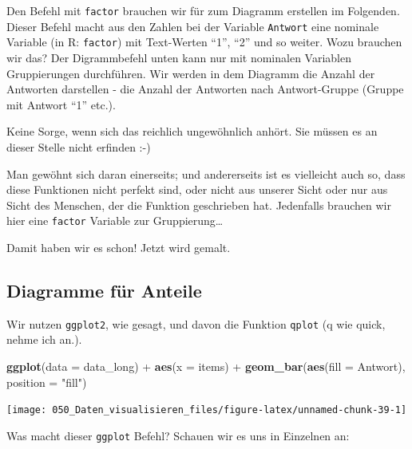 \documentclass[12pt,]{book}
\newenvironment{Shaded}{\begin{snugshade}}{\end{snugshade}}
\newcommand{\KeywordTok}[1]{\textcolor[rgb]{0.13,0.29,0.53}{\textbf{{#1}}}}
\newcommand{\DataTypeTok}[1]{\textcolor[rgb]{0.13,0.29,0.53}{{#1}}}
\newcommand{\StringTok}[1]{\textcolor[rgb]{0.31,0.60,0.02}{{#1}}}
\newcommand{\NormalTok}[1]{{#1}}
\begin{document}
Den Befehl mit \texttt{factor} brauchen wir für zum Diagramm erstellen
im Folgenden. Dieser Befehl macht aus den Zahlen bei der Variable
\texttt{Antwort} eine nominale Variable (in R: \texttt{factor}) mit
Text-Werten ``1'', ``2'' und so weiter. Wozu brauchen wir das? Der
Digrammbefehl unten kann nur mit nominalen Variablen Gruppierungen
durchführen. Wir werden in dem Diagramm die Anzahl der Antworten
darstellen - die Anzahl der Antworten nach Antwort-Gruppe (Gruppe mit
Antwort ``1'' etc.).

Keine Sorge, wenn sich das reichlich ungewöhnlich anhört. Sie müssen es
an dieser Stelle nicht erfinden :-)

Man gewöhnt sich daran einerseits; und andererseits ist es vielleicht
auch so, dass diese Funktionen nicht perfekt sind, oder nicht aus
unserer Sicht oder nur aus Sicht des Menschen, der die Funktion
geschrieben hat. Jedenfalls brauchen wir hier eine \texttt{factor}
Variable zur Gruppierung\ldots{}

Damit haben wir es schon! Jetzt wird gemalt.

\subsection{Diagramme für Anteile}\label{diagramme-fur-anteile}

Wir nutzen \texttt{ggplot2}, wie gesagt, und davon die Funktion
\texttt{qplot} (q wie quick, nehme ich an.).

\begin{Shaded}
\begin{Highlighting}[]
\KeywordTok{ggplot}\NormalTok{(}\DataTypeTok{data =} \NormalTok{data_long) +}
\StringTok{  }\KeywordTok{aes}\NormalTok{(}\DataTypeTok{x =} \NormalTok{items)  +}
\StringTok{  }\KeywordTok{geom_bar}\NormalTok{(}\KeywordTok{aes}\NormalTok{(}\DataTypeTok{fill =} \NormalTok{Antwort), }\DataTypeTok{position =} \StringTok{"fill"}\NormalTok{) }
\end{Highlighting}
\end{Shaded}

\begin{center}\texttt{[image: 050\_Daten\_visualisieren\_files/figure-latex/unnamed-chunk-39-1]} \end{center}

Was macht dieser \texttt{ggplot} Befehl? Schauen wir es uns in Einzelnen
an:
\end{document}
